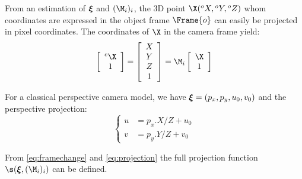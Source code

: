 \documentclass{ecnreport}
\begin{document}
From an estimation of ${\boldsymbol{\xi}}$ and $(\M_i)_i$, the 3D point $\X({}^o X,{}^o Y,{}^o Z)$ whom coordinates are expressed in the object frame $\Frame{o}$ can easily be projected in pixel coordinates.
The coordinates of $\X$ in the camera frame yield:
\begin{equation}\label{eq:framechange}
 \left[\begin{array}{c}{}^c\X\\1\end{array}\right]=   \left[\begin{array}{c}X\\Y\\Z\\1\end{array}\right] =\M_i\left[\begin{array}{c}\X\\1\end{array}\right]
\end{equation}

For a classical perspective camera model, we have ${\boldsymbol{\xi}} = (p_x, p_y, u_0, v_0)$ and the perspective projection:
\begin{equation}\label{eq:projection}
 \left\{\begin{array}{ll}
  u &= p_x.X/Z + u_0 \\
  v &= p_y.Y/Z + v_0
 \end{array}\right.
\end{equation}

From \eqref{eq:framechange} and \eqref{eq:projection} the full projection function $\s(\xii, (\M_i)_i)$ can be defined.\\ 
\end{document}
